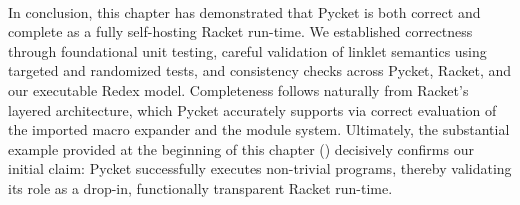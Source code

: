 		\paragraph{}%
			In conclusion, this chapter has demonstrated that Pycket is both correct and complete as a fully self-hosting Racket run-time. We established correctness through foundational unit testing, careful validation of linklet semantics using targeted and randomized tests, and consistency checks across Pycket, Racket, and our executable Redex model. Completeness follows naturally from Racket’s layered architecture, which Pycket accurately supports via correct evaluation of the imported macro expander and the module system. Ultimately, the substantial example provided at the beginning of this chapter () decisively confirms our initial claim: Pycket successfully executes non-trivial  programs, thereby validating its role as a drop-in, functionally transparent Racket run-time.
